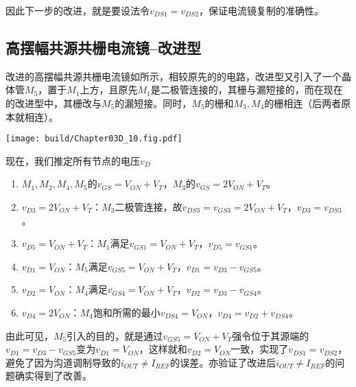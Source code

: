 因此下一步的改进，就是要设法令$v_{DS1}=v_{DS2}$，保证电流镜复制的准确性。

\subsection{高摆幅共源共栅电流镜--改进型}
改进的高摆幅共源共栅电流镜如所示，相较原先的的电路，改进型又引入了一个晶体管$M_5$，置于$M_1$上方，且原先$M_1$是二极管连接的，其栅与漏短接的，而在现在的改进型中，其栅改与$M_5$的漏短接。同时，$M_5$的栅和$M_3,M_4$的栅相连（后两者原本就相连）。

\begin{Figure}
    \texttt{[image: build/Chapter03D\_10.fig.pdf]}
\end{Figure}

现在，我们推定所有节点的电压$v_D$
\begin{enumerate}
    \item $M_1,M_2,M_4,M_5$的$v_{GS}=V_{ON}+V_T$，$M_3$的$v_{GS}=2V_{ON}+V_T$。
    \item $v_{D3}=2V_{ON}+V_T$：$M_3$二极管连接，故$v_{DS3}=v_{GS3}=2V_{ON}+V_T$，$v_{D3}=v_{DS3}$。
    \item $v_{D5}=V_{ON}+V_T$：$M_1$满足$v_{GS1}=V_{ON}+V_T$，$v_{D5}=v_{GS1}$。
    \item $v_{D1}=V_{ON}$：$M_5$满足$v_{GS5}=V_{ON}+V_T$，$v_{D1}=v_{D3}-v_{GS5}$。
    \item $v_{D2}=V_{ON}$：$M_4$满足$v_{GS4}=V_{ON}+V_T$，$v_{D2}=v_{D3}-v_{GS4}$。
    \item $v_{D4}=2V_{ON}$：$M_4$饱和所需的最小$v_{DS4}=V_{ON}$，$v_{D4}=v_{D2}+v_{DS4}$。
\end{enumerate}
由此可见，$M_5$引入的目的，就是通过$v_{GS5}=V_{ON}+V_T$强令位于其源端的$v_{D1}=v_{D3}-v_{GS5}$变为$v_{D1}=V_{ON}$，这样就和$v_{D2}=V_{ON}$一致，实现了$v_{DS1}=v_{DS2}$，避免了因为沟道调制导致的$i_{OUT}\neq I_{REF}$的误差。亦验证了改进后$i_{OUT}\neq I_{REF}$的问题确实得到了改善。


